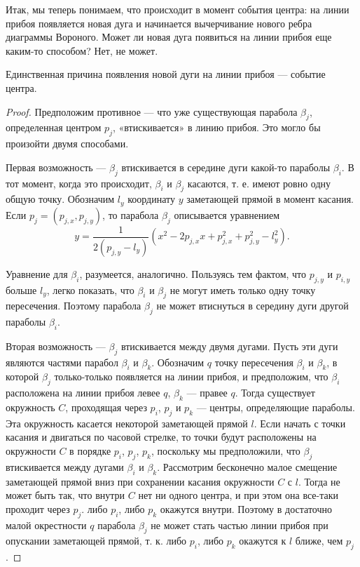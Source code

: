 Итак,  мы  теперь  понимаем,  что  происходит  в  момент  события  центра:  на  линии  прибоя  появляется  новая  дуга  и  начинается  вычерчивание  нового  ребра  диаграммы  Вороного. 
Может  ли  новая  дуга  появиться  на  линии  прибоя  еще  каким-то способом? 
Нет,  не  может.

\begin{lemma}
	Единственная  причина  появления  новой  дуги  на  линии  прибоя  ---  событие  центра.
\end{lemma}
\begin{proof}
	Предположим  противное  ---  что  уже существующая  парабола  $\beta_j$,  определенная  центром  $p_j$, «втискивается»  в линию  прибоя. 
	Это  могло  бы  произойти  двумя  способами.
	
	Первая  возможность  --- $\beta_j$  втискивается  в  середине дуги  какой-то  параболы $\beta_i$.
	В  тот  момент,  когда  это  происходит, $\beta_i$  и  $\beta_j$  касаются,  т.  е.  имеют  ровно  одну  общую  точку.
	Обозначим  $l_y$  координату  $y$  заметающей  прямой  в  момент  касания.
	Если $p_j = (p_{j,x}, p_{j,y})$,  то  парабола $\beta_j$ описывается  уравнением $$y = \frac{1}{2 (p_{j,y} - l_y)} (x^2 - 2 p_{j,x} x + p_{j,x}^2 + p_{j,y}^2 - l_y^2).$$
	
	Уравнение  для $\beta_i$,  разумеется,  аналогично.
	Пользуясь тем  фактом,  что $p_{j,y}$ и $p_{i,y}$ больше $l_y$,  легко  показать,  что $\beta_i$ и $\beta_j$ не  могут  иметь  только  одну  точку  пересечения.
	Поэтому  парабола $\beta_j$  не  может  втиснуться  в  середину  дуги другой  параболы $\beta_i$.
	
	Вторая  возможность  --- $\beta_j$  втискивается  между  двумя  дугами.
	Пусть  эти  дуги  являются  частями  парабол $\beta_i$  и  $\beta_k$.  Обозначим  $q$  точку  пересечения  $\beta_i$ и  $\beta_k$,  в  которой $\beta_j$ только-только  появляется  на  линии  прибоя,  и  предположим,  что  $\beta_i$  расположена на  линии  прибоя  левее  $q$,  $\beta_k$  ---  правее  $q$.
	Тогда  существует  окружность  $C$,  проходящая  через  $p_i$, $p_j$  и  $p_k$ ---  центры,  определяющие  параболы.
	Эта  окружность  касается  некоторой  заметающей  прямой  $l$.
	Если  начать  с  точки  касания  и двигаться  по  часовой  стрелке,  то  точки  будут  расположены  на  окружности  $C$  в порядке $p_i$, $p_j$,  $p_k$,  поскольку  мы  предположили,  что $\beta_j$  втискивается  между  дугами  $\beta_i$  и  $\beta_k$.
	Рассмотрим  бесконечно  малое  смещение  заметающей  прямой  вниз  при  сохранении  касания  окружности  $C$  с  $l$.
	Тогда  не  может  быть  так,  что  внутри $C$  нет  ни  одного  центра,  и  при  этом  она  все-таки  проходит  через $p_j$.  либо $p_i$,  либо $p_k$ окажутся  внутри.  
	Поэтому  в  достаточно  малой  окрестности  $q$  парабола $\beta_j$  не  может стать  частью  линии  прибоя  при  опускании  заметающей  прямой,  т.  к.  либо  $p_i$,  либо $p_k$ окажутся  к $l$ ближе, чем $p_j$.
\end{proof}

